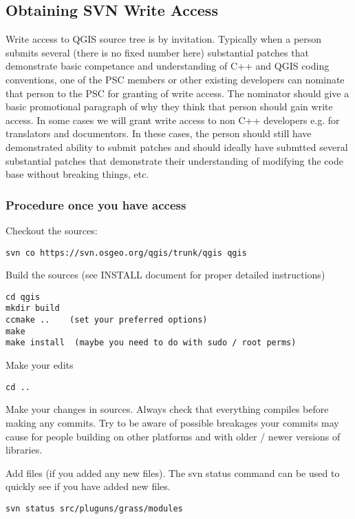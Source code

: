 \subsection{Obtaining SVN Write Access}
Write access to QGIS source tree is by invitation. Typically when a person
submits several (there is no fixed number here) substantial patches that
demonstrate basic competance and understanding of C++ and QGIS coding
conventions, one of the PSC members or other existing developers can nominate
that person to the PSC for granting of write access. The nominator should give
a basic promotional paragraph of why they think that person should gain write
access. In some cases we will grant write access to non C++ developers e.g. for
translators and documentors.  In these cases, the person should still have
demonstrated ability to submit patches and should ideally have submtted several
substantial patches that demonstrate their understanding of modifying the code
base without breaking things, etc.

\subsubsection{Procedure once you have access}
Checkout the sources:

\begin{verbatim}
svn co https://svn.osgeo.org/qgis/trunk/qgis qgis
\end{verbatim}

Build the sources (see INSTALL document for proper detailed instructions)

\begin{verbatim}
cd qgis
mkdir build
ccmake ..    (set your preferred options)
make
make install  (maybe you need to do with sudo / root perms)
\end{verbatim}

Make your edits

\begin{verbatim}
cd ..
\end{verbatim}

Make your changes in sources. Always check that everything compiles before
making any commits.  Try to be aware of possible breakages your commits may
cause for people building on other platforms and with older / newer versions of
libraries.

Add files (if you added any new files). The svn status command can be used to
quickly see if you have added new files.

\begin{verbatim}
svn status src/pluguns/grass/modules
\end{verbatim}

